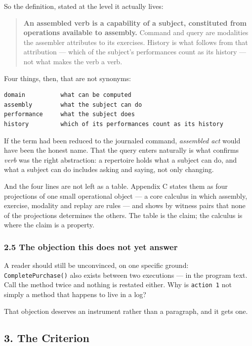 \documentclass[
]{article}
\newcounter{none} %
\begin{document}
So the definition, stated at the level it actually lives:

\begin{quote}
\textbf{An assembled verb is a capability of a subject, constituted from
operations available to assembly.} Command and query are modalities the
assembler attributes to its exercises. History is what follows from that
attribution --- which of the subject's performances count as its history
--- not what makes the verb a verb.
\end{quote}

Four things, then, that are not synonyms:

\begin{verbatim}
domain          what can be computed
assembly        what the subject can do
performance     what the subject does
history         which of its performances count as its history
\end{verbatim}

If the term had been reduced to the journaled command, \emph{assembled
act} would have been the honest name. That the query enters naturally is
what confirms \emph{verb} was the right abstraction: a repertoire holds
what a subject can do, and what a subject can do includes asking and
saying, not only changing.

And the four lines are not left as a table. Appendix C states them as
four projections of one small operational object --- a core calculus in
which assembly, exercise, modality and replay are rules --- and shows by
witness pairs that none of the projections determines the others. The
table is the claim; the calculus is where the claim is a property.

\subsubsection{2.5 The objection this does not yet
answer}\label{the-objection-this-does-not-yet-answer}

A reader should still be unconvinced, on one specific ground:
\texttt{CompletePurchase()} also exists between two executions --- in
the program text. Call the method twice and nothing is restated either.
Why is \texttt{action\ 1} not simply a method that happens to live in a
log?

That objection deserves an instrument rather than a paragraph, and it
gets one.

\subsection{3. The Criterion}\label{the-criterion}
\end{document}
